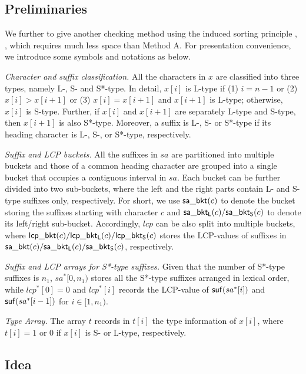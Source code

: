 \documentclass[10pt,journal,compsoc]{IEEEtran}
\begin{document}
\subsection{Preliminaries} \label{sec:method2:preliminaries}

We further to give another checking method using the induced sorting principle {\color{blue} \cite{sais,ka}}, , which requires much less space than Method A. For presentation convenience, we introduce some symbols and notations as below.

{\em Character and suffix classification.} All the characters in $x$ are classified into three types, namely L-, S- and S*-type. In detail, $x[i]$ is L-type if (1) $i = n - 1$ or (2) $x[i] > x[i + 1]$ or (3) $x[i] = x[i + 1]$ and $x[i + 1]$ is L-type; otherwise, $x[i]$ is S-type. Further, if $x[i]$ and $x[i + 1]$ are separately L-type and S-type, then $x[i + 1]$ is also S*-type. Moreover, a suffix is L-, S- or S*-type if its heading character is L-, S-, or S*-type, respectively.

{\em Suffix and LCP buckets.} All the suffixes in $sa$ are partitioned into multiple buckets and those of a common heading character are grouped into a single bucket that occupies a contiguous interval in $sa$. Each bucket can be further divided into two sub-buckets, where the left and the right parts  contain L- and S-type suffixes only, respectively. For short, we use ${\sf sa\_bkt}(c)$ to denote the bucket storing the suffixes starting with character $c$ and ${\sf sa\_bkt_L}(c)/{\sf sa\_bkt_S}(c)$ to denote its left/right sub-bucket. Accordingly, $lcp$ can be also split into multiple buckets, where ${\sf lcp\_bkt}(c)/{\sf lcp\_bkt_L}(c)/{\sf lcp\_bkt_S}(c)$ stores the LCP-values of suffixes in ${\sf sa\_bkt}(c)/{\sf sa\_bkt_L}(c)/{\sf sa\_bkt_S}(c)$, respectively.

{\em Suffix and LCP arrays for S*-type suffixes.} Given that the number of S*-type suffixes is $n_1$, $sa^*[0, n_1)$ stores all the S*-type suffixes arranged in lexical order, while $lcp^*[0] = 0$ and $lcp^*[i]$ records the LCP-value of ${\sf suf}(sa^*[i])$ and ${\sf suf}(sa^*[i - 1])$ for $i \in [1, n_1)$.

{\em Type Array.} The array $t$ records in $t[i]$ the type information of $x[i]$, where $t[i] = 1$ or $0$ if $x[i]$ is S- or L-type, respectively.

\subsection{Idea} \label{sec:method2:idea}
\end{document}

